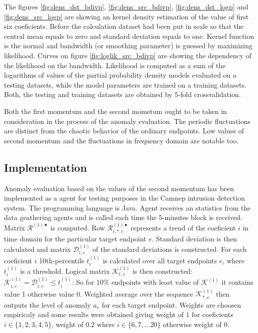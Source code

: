 \documentclass[a4paper,journal]{IEEEtran}
\begin{document}
The figures \ref{fig:dens_dst_bdivp}, \ref{fig:dens_src_bdivp},
\ref{fig:dens_dst_logp} and \ref{fig:dens_src_logp} are showing
an kernel density estimation of the value of first six coeficients.
Before the calculation dataset had been put in scale so that the
central mean equals to zero and standard deviation equals to one.
Kernel function is the normal and bandwidth (or smoothing parameter)
is guessed by maximizing likelihood. 
Curves on figure \ref{fig:loglik_src_bdivp} are showing
the dependency of the likelihood on the bandwidth. 
Likelihood is computed as a sum of the logarithms of values of the
partial probability density models evaluated on a testing datasets,
while the model parameters are trained on a training datasets. 
Both, the testing and training datasets are obtained by 5-fold
crossvalidation.

Both the first momentum and the second mometum ought to be taken in
consideration in the process of the anomaly evaluation.
The periodic fluctuations are distinct from the
chaotic behavior of the ordinary endpoints. Low values of second
momentum and the fluctuations in frequency domain are notable too.

\subsection{Implementation}
Anomaly evaluation based on the values of the second momentum has
been implemented as a agent for testing purposes in the Camnep
intrusion detection system. The programming language is Java.
Agent receives an statistics from the data geathering agents and
is called each time the 5-minutes block is received. Matrix
$\mathcal{R}^{(1)\bullet}$ is computed. Row
$\mathcal{R}^{(1)\bullet}_{i,*,e}$ represents a trend of the
coeficient $i$ in time domain for the particular target endpoint $e$.
Standard deviation is then calculated and matrix 
$\mathcal{D}^{(1)}_{i,e}$ of the standard deviations is constructed.
For each coeficient $i$ 10th-percentile $t^{(1)}_i$ is calculated
over all target endpoints $e$, where $t^{(1)}_i$ is a threshold.
Logical matrix $\mathcal{K}^{(1)}_{t,e}$ is then constructed:
$\mathcal{K}^{(1)}_{i,e} = \mathcal{D}^{(1)}_{i,e} \le t^{(1)}_i $.
So for 10\% endpoints with least value of $\mathcal{K}^{(1)}$
it contains value 1 otherwise value 0. Weighted average over the
sequence $\mathcal{K}^{(1)}_{*,e}$ then outputs the level of anomaly
$a_e$ for each target endpoint. 
Weights are choosen empiricaly and some results were obtained giving
weight of $1$ for coeficients $i \in \{1,2,3,4,5\}$, weight of $0.2$
where $i\in \{6,7,... 20\}$ otherwise weight of $0$.
\end{document}
